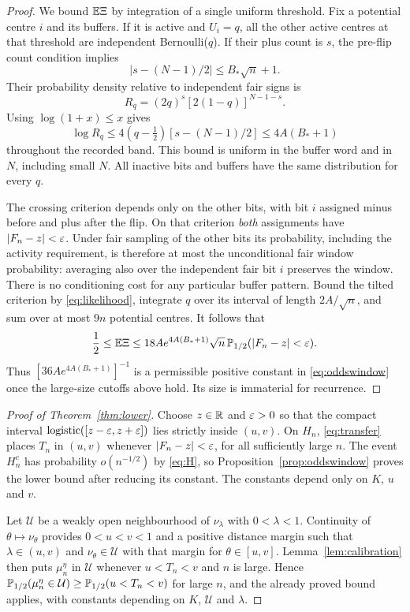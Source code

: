 \begin{proof}
We bound $\mathbb E\Xi$ by integration of a single uniform threshold. Fix a potential centre $i$ and its buffers. If it is active and $U_i=q$, all the other active centres at that threshold are independent Bernoulli($q$). If their plus count is $s$, the pre-flip count condition implies
\[
 |s-(N-1)/2|\le B_*\sqrt n+1.
\]
Their probability density relative to independent fair signs is
\[
 R_q=(2q)^s[2(1-q)]^{N-1-s}.
\]
Using $\log(1+x)\le x$ gives
\begin{equation}\label{eq:likelihood}
 \log R_q\le 4(q-\tfrac12)[s-(N-1)/2]\le4A(B_*+1)
\end{equation}
throughout the recorded band. This bound is uniform in the buffer word and in $N$, including small $N$. All inactive bits and buffers have the same distribution for every $q$.

The crossing criterion depends only on the other bits, with bit $i$ assigned minus before and plus after the flip. On that criterion \emph{both} assignments have $|F_n-z|<\varepsilon$. Under fair sampling of the other bits its probability, including the activity requirement, is therefore at most the unconditional fair window probability: averaging also over the independent fair bit $i$ preserves the window. There is no conditioning cost for any particular buffer pattern. Bound the tilted criterion by \eqref{eq:likelihood}, integrate $q$ over its interval of length $2A/\sqrt n$, and sum over at most $9n$ potential centres. It follows that
\[
 \frac12\le\mathbb E\Xi
 \le18A e^{4A(B_*+1)}\sqrt n\,
       \mathbb P_{1/2}(|F_n-z|<\varepsilon).
\]
Thus $[36A e^{4A(B_*+1)}]^{-1}$ is a permissible positive constant in \eqref{eq:oddswindow} once the large-size cutoffs above hold. Its size is immaterial for recurrence.
\end{proof}

\begin{proof}[Proof of Theorem~\ref{thm:lower}]
Choose $z\in\mathbb R$ and $\varepsilon>0$ so that the compact interval
$\operatorname{logistic}([z-\varepsilon,z+\varepsilon])$ lies strictly inside $(u,v)$. On $H_n$, \eqref{eq:transfer} places $T_n$ in $(u,v)$ whenever $|F_n-z|<\varepsilon$, for all sufficiently large $n$. The event $H_n^c$ has probability $o(n^{-1/2})$ by \eqref{eq:H}, so Proposition~\ref{prop:oddswindow} proves the lower bound after reducing its constant. The constants depend only on $K$, $u$ and $v$.

Let $\mathcal U$ be a weakly open neighbourhood of $\nu_\lambda$ with $0<\lambda<1$. Continuity of $\theta\mapsto\nu_\theta$ provides $0<u<v<1$ and a positive distance margin such that $\lambda\in(u,v)$ and $\nu_\theta\in\mathcal U$ with that margin for $\theta\in[u,v]$. Lemma~\ref{lem:calibration} then puts $\mu_n^\eta$ in $\mathcal U$ whenever $u<T_n<v$ and $n$ is large. Hence $\mathbb P_{1/2}(\mu_n^\eta\in\mathcal U)\ge\mathbb P_{1/2}(u<T_n<v)$ for large $n$, and the already proved bound applies, with constants depending on $K$, $\mathcal U$ and $\lambda$.
\end{proof}
